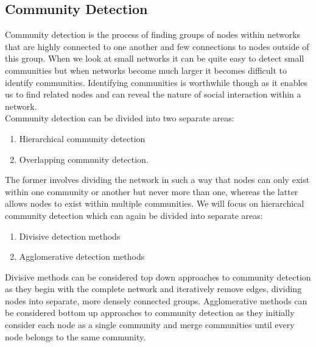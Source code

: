 \documentclass[conference]{IEEEtran}
\begin{document}
	\subsection{Community Detection}
		{
			Community detection is the process of finding groups of nodes within networks that are highly connected to one another and few connections to nodes outside of this group. When we look at small networks it can be quite easy to detect small communities but when networks become much larger it becomes difficult to identify communities. Identifying communities is worthwhile though as it enables us to find related nodes and can reveal the nature of social interaction within a network. \\
			
			Community detection can be divided into two separate areas: 
				\begin{enumerate}
					\item Hierarchical community detection
					\item Overlapping community detection. 
				\end{enumerate}
			The former involves dividing the network in such a way that nodes can only exist within one community or another but never more than one, whereas the latter allows nodes to exist within multiple communities. We will focus on hierarchical community detection which can again be divided into separate areas: 
				\begin{enumerate}
					\item Divisive detection methods
					\item Agglomerative detection methods
				\end{enumerate}
			Divisive methods can be considered top down approaches to community detection as they begin with the complete network and iteratively remove edges, dividing nodes into separate, more densely connected groups. Agglomerative methods can be considered bottom up approaches to community detection as they initially consider each node as a single community and merge communities until every node belongs to the same community.
			
}
\end{document}
